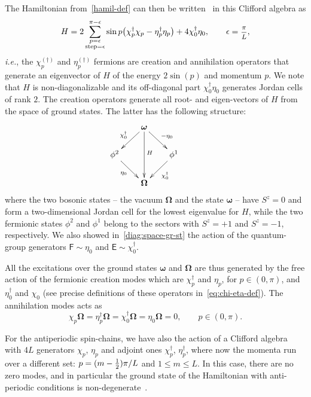 \documentclass[11pt]{article}
\newcommand{\ffrac}[2]{\mbox{\footnotesize$\displaystyle\frac{#1}{#2}$}}
\newcommand{\F}{\mathsf{F}}
\newcommand{\E}{\mathsf{E}}
\newcommand{\half}{%
  \mathchoice{\ffrac{1}{2}}{\frac{1}{2}}{\frac{1}{2}}{\frac{1}{2}}}
\newcommand{\phip}{\phi^{2}}
\newcommand{\phim}{\phi^{1}}
\newcommand{\vac}{\boldsymbol{\Omega}}
\newcommand{\lvac}{\boldsymbol{\omega}}
\newcommand{\step}{\epsilon}
\theoremstyle{definition}
\begin{document}
The Hamiltonian from~\eqref{hamil-def} can then be written~\cite[Sec.~4.1]{GRS1} in this Clifford algebra as
\begin{equation}\label{eq:def-hamilt-gl}
H=
2\sum_{\substack{p=\step\\\text{step}=\step}}^{\pi-\step}\sin{p}\bigl(\chi^{\dagger}_p\chi_{p}
- \eta^{\dagger}_p\eta_{p}\bigr) + 4 \chi^{\dagger}_0\eta_0,\qquad \step=\ffrac{\pi}{L},
\end{equation}
{\it i.e.},
the $\chi^{(\dagger)}_p$ and $\eta^{(\dagger)}_p$ fermions are creation and
annihilation operators that generate an eigenvector of
$H$  of the energy $2\sin(p)$ and momentum $p$. We note that $H$ is non-diagonalizable and  its off-diagonal part
$\chi^{\dagger}_0\eta_0$  generates  Jordan cells of rank $2$.
The creation operators generate  all root-
and eigen-vectors of $H$ from the space of ground states.
The latter has the following structure:
\begin{equation}\label{diag:space-gr-st}
   \xymatrix@=20pt{
     &\lvac\ar[dl]_{\chi^{\dagger}_0} \ar[dr]^{-\eta_0} \ar[dd]^(0.45){H}&&\\
     \phip\ar[dr]_{\eta_0}
       &&\phim\ar[dl]^{\chi^{\dagger}_0} &\\
     &\vac&&
   }
\end{equation}
where the two bosonic
states -- the vacuum $\vac$ and the state $\lvac$ -- have $S^z=0$ and
 form a
two-dimensional Jordan cell for the lowest eigenvalue for $H$, while the two fermionic states $\phip$ and $\phim$ belong to the
sectors with $S^z=+1$ and $S^z=-1$, respectively. We also
showed in~\eqref{diag:space-gr-st} the action of the quantum-group generators $\F\sim\eta_0$
and $\E\sim\chi^{\dagger}_0$.

All the excitations over the ground states
$\lvac$ and $\vac$ are thus generated by the free action of the
 fermionic  creation modes which are $\chi^{\dagger}_{p}$ and $\eta_p$, for $p\in(0,\pi)$,
and
$\eta^{\dagger}_0$ and
$\chi_0$ (see precise definitions of these operators in~\eqref{eq:chi-eta-def}). The
annihilation modes acts as
\begin{equation}
\chi_{p}\vac = \eta^{\dagger}_p\vac = \chi^{\dagger}_0\vac =
\eta_0\vac =0, \qquad p\in(0,\pi).
\end{equation}

\medskip

For the antiperiodic spin-chains, we have also the action of  a Clifford algebra with
$4L$ generators  $\chi_{p}$, $\eta_p$ and
adjoint ones $\chi^{\dagger}_{p}$, $\eta^{\dagger}_p$, where now the
momenta run over a different set: $p=(m-\half)\pi/L$ and $1\leq m\leq L$. In this case, there are
no zero modes, and in particular the ground state of the Hamiltonian with
anti-periodic conditions is non-degenerate~\cite{GRS1}.
\end{document}
